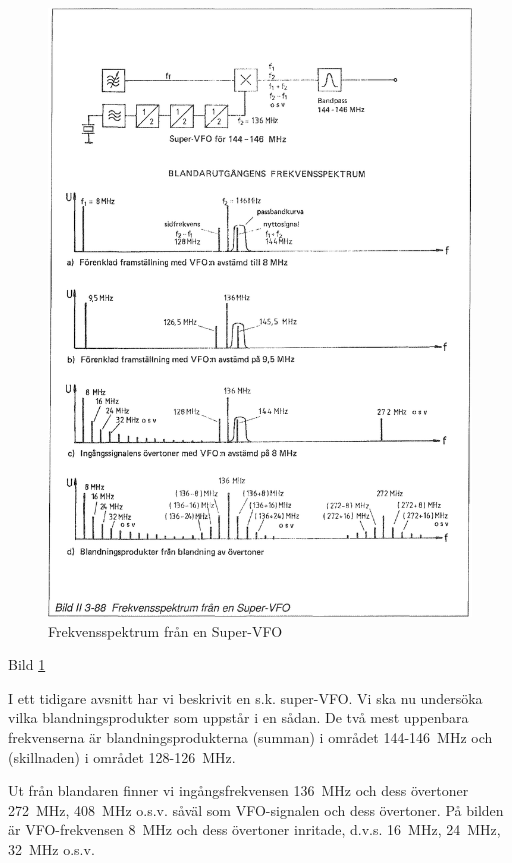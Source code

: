 \begin{figure}
\includegraphics[width=\textwidth]{images/bild_2_3-88}
\caption{Frekvensspektrum från en Super-VFO}
\label{fig:BildII3-88}
\end{figure}

Bild \ref{fig:BildII3-88}

I ett tidigare avsnitt har vi beskrivit en s.k.  super-VFO. Vi ska
nu undersöka vilka blandningsprodukter som uppstår i en sådan. De två
mest uppenbara frekvenserna är blandningsprodukterna (summan) i
området 144-146~MHz och (skillnaden) i området 128-126~MHz.

Ut från blandaren finner vi ingångsfrekvensen 136~MHz och dess
övertoner 272~MHz, 408~MHz o.s.v. såväl som VFO-signalen och dess
övertoner. På bilden är VFO-frekvensen 8~MHz och dess övertoner
inritade, d.v.s. 16~MHz, 24~MHz, 32~MHz o.s.v.


